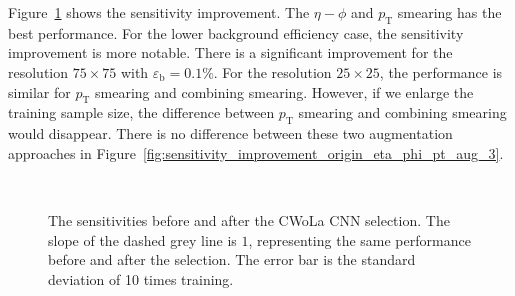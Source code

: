 \documentclass[12pt]{article}
\begin{document}
		Figure~\ref{fig:sensitivity_improvement_origin_eta_phi_pt_aug_1} shows the sensitivity improvement. The $\eta-\phi$ and $p_{\text{T}}$ smearing has the best performance. For the lower background efficiency case, the sensitivity improvement is more notable. There is a significant improvement for the resolution $75\times 75$ with $\varepsilon_{\text{b}} = 0.1\%$. For the resolution $25\times 25$, the performance is similar for $p_{\text{T}}$ smearing and combining smearing. However, if we enlarge the training sample size, the difference between $p_{\text{T}}$ smearing and combining smearing would disappear. There is no difference between these two augmentation approaches in Figure~\ref{fig:sensitivity_improvement_origin_eta_phi_pt_aug_3}.
		\begin{figure}[htpb]
			\centering
			 \\
			\caption{The sensitivities before and after the CWoLa CNN selection. The slope of the dashed grey line is $1$, representing the same performance before and after the selection. The error bar is the standard deviation of 10 times training.}
			\label{fig:sensitivity_improvement_origin_eta_phi_pt_aug_1}
		\end{figure}
\end{document}
